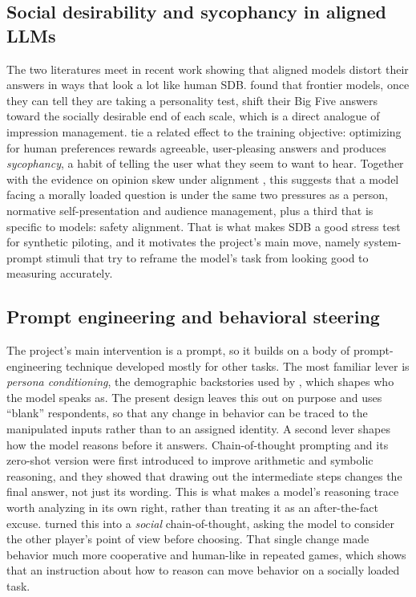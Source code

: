 \documentclass[14pt,a4paper]{extarticle}
\let\cite\squarecite
\begin{document}
\subsection{Social desirability and sycophancy in aligned LLMs}

The two literatures meet in recent work showing that aligned models distort their answers in ways that look a lot like human SDB. \textcite{salecha2024} found that frontier models, once they can tell they are taking a personality test, shift their Big Five answers toward the socially desirable end of each scale, which is a direct analogue of impression management. \textcite{sharma2023} tie a related effect to the training objective: optimizing for human preferences rewards agreeable, user-pleasing answers and produces \emph{sycophancy}, a habit of telling the user what they seem to want to hear. Together with the evidence on opinion skew under alignment \cite{santurkar2023}, this suggests that a model facing a morally loaded question is under the same two pressures as a person, normative self-presentation and audience management, plus a third that is specific to models: safety alignment. That is what makes SDB a good stress test for synthetic piloting, and it motivates the project's main move, namely system-prompt stimuli that try to reframe the model's task from looking good to measuring accurately.

\subsection{Prompt engineering and behavioral steering}

The project's main intervention is a prompt, so it builds on a body of prompt-engineering technique developed mostly for other tasks. The most familiar lever is \emph{persona conditioning}, the demographic backstories used by \textcite{argyle2023}, which shapes who the model speaks as. The present design leaves this out on purpose and uses ``blank'' respondents, so that any change in behavior can be traced to the manipulated inputs rather than to an assigned identity. A second lever shapes how the model reasons before it answers. Chain-of-thought prompting \cite{wei2022} and its zero-shot version \cite{kojima2022} were first introduced to improve arithmetic and symbolic reasoning, and they showed that drawing out the intermediate steps changes the final answer, not just its wording. This is what makes a model's reasoning trace worth analyzing in its own right, rather than treating it as an after-the-fact excuse. \textcite{akata2025} turned this into a \emph{social} chain-of-thought, asking the model to consider the other player's point of view before choosing. That single change made behavior much more cooperative and human-like in repeated games, which shows that an instruction about how to reason can move behavior on a socially loaded task.
\end{document}
